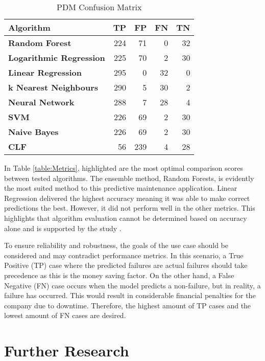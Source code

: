 \begin{table}[h]    
    \centering
    \caption{PDM Confusion Matrix}
    \label{table:Conf}
    \begin{tabular}{lrrrr}
        \toprule
        \textbf{Algorithm} &   \textbf{TP} &   \textbf{FP} &  \textbf{FN} &  \textbf{TN} \\
        \midrule
        \textbf{Random Forest} &  224 &   71 &   0 &  32 \\
        \textbf{Logarithmic Regression} &  225 &   70 &   2 &  30 \\
        \textbf{Linear Regression} &  295 &    0 &  32 &   0 \\
        \textbf{k Nearest Neighbours} &  290 &    5 &  30 &   2 \\
        \textbf{Neural Network} &  288 &    7 &  28 &   4 \\
        \textbf{SVM} &  226 &   69 &   2 &  30 \\
        \textbf{Naive Bayes} &  226 &   69 &   2 &  30 \\
        \textbf{CLF} &   56 &  239 &   4 &  28 \\
        \bottomrule
    \end{tabular}
\end{table}

In Table \ref{table:Metrics}, highlighted are the most optimal comparison scores between tested algorithms.
The ensemble method, Random Forests, is evidently the most suited method to this predictive maintenance application.
Linear Regression delivered the highest accuracy meaning it was able to make correct predictions the best. 
However, it did not perform well in the other metrics. 
This highlights that algorithm evaluation cannot be determined based on accuracy alone and is supported by the study \cite{8320256}.

To ensure reliability and robustness, the goals of the use case should be considered and may contradict performance metrics.
In this scenario, a True Positive (TP) case where the predicted failures are actual failures should take precedence as this is the money saving factor. 
On the other hand, a False Negative (FN) case occurs when the model predicts a non-failure, but in reality, a failure has occurred. 
This would result in considerable financial penalties for the company due to downtime.
Therefore, the highest amount of TP cases and the lowest amount of FN cases are desired.

\section{Further Research}


